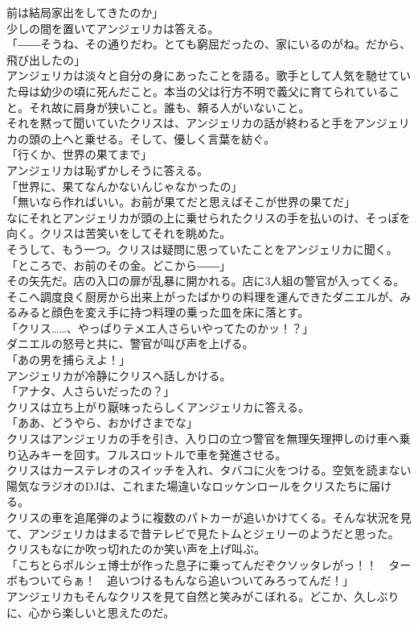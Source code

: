 \documentclass[b5j,10pt,openany]{jsbook}
\begin{document}
前は結局家出をしてきたのか」\\少しの間を置いてアンジェリカは答える。\\「――そうね、その通りだわ。とても窮屈だったの、家にいるのがね。だから、飛び出したの」\\アンジェリカは淡々と自分の身にあったことを語る。歌手として人気を馳せていた母は幼少の頃に死んだこと。本当の父は行方不明で義父に育てられていること。それ故に肩身が狭いこと。誰も、頼る人がいないこと。\\それを黙って聞いていたクリスは、アンジェリカの話が終わると手をアンジェリカの頭の上へと乗せる。そして、優しく言葉を紡ぐ。\\「行くか、世界の果てまで」\\アンジェリカは恥ずかしそうに答える。\\「世界に、果てなんかないんじゃなかったの」\\「無いなら作ればいい。お前が果てだと思えばそこが世界の果てだ」\\なにそれとアンジェリカが頭の上に乗せられたクリスの手を払いのけ、そっぽを向く。クリスは苦笑いをしてそれを眺めた。\\そうして、もう一つ。クリスは疑問に思っていたことをアンジェリカに聞く。\\「ところで、お前のその金。どこから――」\\その矢先だ。店の入口の扉が乱暴に開かれる。店に3人組の警官が入ってくる。\\そこへ調度良く厨房から出来上がったばかりの料理を運んできたダニエルが、みるみると顔色を変え手に持つ料理の乗った皿を床に落とす。\\「クリス\ldots{}\ldots{}、やっぱりテメエ人さらいやってたのかッ！？」\\ダニエルの怒号と共に、警官が叫び声を上げる。\\「あの男を捕らえよ！」\\アンジェリカが冷静にクリスへ話しかける。\\「アナタ、人さらいだったの？」\\クリスは立ち上がり厭味ったらしくアンジェリカに答える。\\「ああ、どうやら、おかげさまでな」\\クリスはアンジェリカの手を引き、入り口の立つ警官を無理矢理押しのけ車へ乗り込みキーを回す。フルスロットルで車を発進させる。\\クリスはカーステレオのスイッチを入れ、タバコに火をつける。空気を読まない陽気なラジオのDJは、これまた場違いなロッケンロールをクリスたちに届ける。\\クリスの車を追尾弾のように複数のパトカーが追いかけてくる。そんな状況を見て、アンジェリカはまるで昔テレビで見たトムとジェリーのようだと思った。\\クリスもなにか吹っ切れたのか笑い声を上げ叫ぶ。\\「こちとらポルシェ博士が作った息子に乗ってんだぞクソッタレがっ！！　ターボもついてらぁ！　追いつけるもんなら追いついてみろってんだ！」\\アンジェリカもそんなクリスを見て自然と笑みがこぼれる。どこか、久しぶりに、心から楽しいと思えたのだ。
\end{document}
